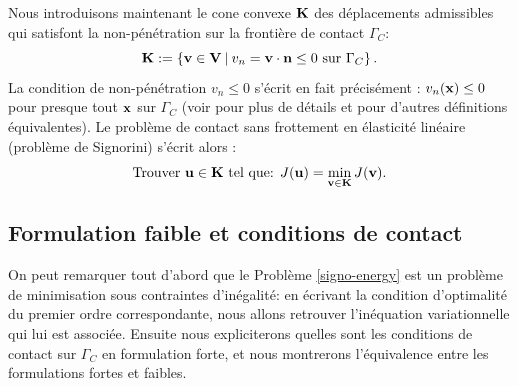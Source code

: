 \documentclass[11pt]{book}
\def\u{{\bf u}}
\def\n{{\bf n}}
\def\vv{{\bf v}}
\def\x{{\bf x}}
\def\V{{\bf V}}
\def\K{{\bf K}}
\begin{document}
Nous introduisons maintenant le cone convexe $\K$ 
des déplacements admissibles qui satisfont la non-pénétration sur la frontière de contact $\Gamma_C$:
$$
\K := \left\{\vv \in \V \:\middle|\: v_n = \vv \cdot \n \leq 0 \hbox{ sur }\Gamma_C\right\}.
$$
La condition de non-pénétration $ v_n \leq 0$ s'écrit en fait précisément : $v_n (\x) \leq 0$ pour presque tout $\x$ sur $\Gamma_C$ (voir \cite{kikuchi-oden-88} pour plus de détails et pour d'autres définitions équivalentes).
Le problème de contact sans frottement en élasticité linéaire (problème de Signorini) s'écrit alors :
\begin{equation}
\label{signo-energy}
\textrm{Trouver } \u \in \K \textrm{ tel que:} \: %
 \:
 J(\u) = \min_{\vv\in\K} J(\vv).
\end{equation}

\subsection{Formulation faible et conditions de contact}

On peut remarquer tout d'abord que le Problème \eqref{signo-energy} est un problème de minimisation sous contraintes d'inégalité: en écrivant la condition d'optimalité du premier ordre correspondante,
nous allons retrouver l'inéquation variationnelle qui lui est associée.
Ensuite nous expliciterons quelles sont les conditions de contact sur $\Gamma_C$ en formulation forte, et nous montrerons l'équivalence entre les formulations fortes et faibles.
\end{document}
